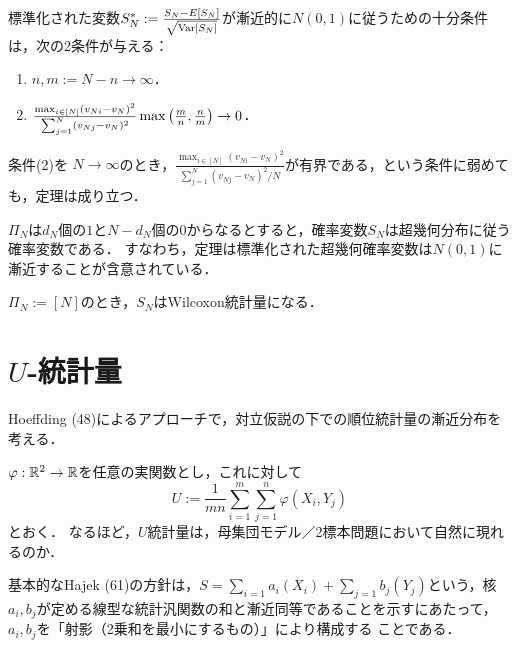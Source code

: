 \documentclass[uplatex,dvipdfmx]{jsreport}
\begin{document}
\begin{theorem}
    標準化された変数$S^*_N:=\frac{S_N-E[S_N]}{\sqrt{\mathrm{Var}[S_N]}}$が漸近的に$N(0,1)$に従うための十分条件は，次の2条件が与える：
    \begin{enumerate}
        \item $n,m:=N-n\to\infty$．
        \item $\frac{\max_{i\in[N]}(v_{Ni}-v_{N})^2}{\sum_{j=1}^N(v_{Nj}-v_N)^2}\max\left(\frac{m}{n},\frac{n}{m}\right)\to0$．
    \end{enumerate}
\end{theorem}

\begin{corollary}
    条件(2)を
    $N\to\infty$のとき，$\frac{\max_{i\in[N]}(v_{Ni}-v_{N})^2}{\sum_{j=1}^N(v_{Nj}-v_N)^2/N}$が有界である，という条件に弱めても，定理は成り立つ．
\end{corollary}

\begin{example}
    $\Pi_N$は$d_N$個の$1$と$N-d_N$個の$0$からなるとすると，確率変数$S_N$は超幾何分布に従う確率変数である．
    すなわち，定理は標準化された超幾何確率変数は$N(0,1)$に漸近することが含意されている．
\end{example}

\begin{example}
    $\Pi_N:=[N]$のとき，$S_N$はWilcoxon統計量になる．
\end{example}

\section{$U$-統計量}

\begin{tcolorbox}[colframe=ForestGreen, colback=ForestGreen!10!white,breakable,colbacktitle=ForestGreen!40!white,coltitle=black,fonttitle=\bfseries\sffamily,
title=]
    Hoeffding (48)によるアプローチで，対立仮説の下での順位統計量の漸近分布を考える．
\end{tcolorbox}

\begin{notation}
    $\varphi:\mathbb{R}^2\to\mathbb{R}$を任意の実関数とし，これに対して
    \[U:=\frac{1}{mn}\sum^m_{i=1}\sum^n_{j=1}\varphi(X_i,Y_j)\]
    とおく．
    なるほど，$U$統計量は，母集団モデル／2標本問題において自然に現れるのか．
\end{notation}

\begin{remarks}
    基本的なHajek (61)の方針は，$S=\sum_{i=1}a_i(X_i)+\sum_{j=1}b_j(Y_j)$という，核$a_i,b_j$が定める線型な統計汎関数の和と漸近同等であることを示すにあたって，$a_i,b_j$を「射影（2乗和を最小にするもの）」により構成する
    ことである．
\end{remarks}
\end{document}
